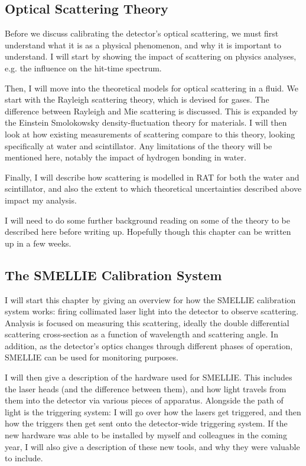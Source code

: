 \subsection{Optical Scattering Theory}
Before we discuss calibrating the detector's optical scattering, we must first understand what it is as a physical phenomenon, and why it is important to understand. I will start by showing the impact of scattering on physics analyses, e.g. the influence on the hit-time spectrum.

Then, I will move into the theoretical models for optical scattering in a fluid. We start with the Rayleigh scattering theory, which is devised for gases. The difference between Rayleigh and Mie scattering is discussed. This is expanded by the Einstein Smolokowsky density-fluctuation theory for materials. I will then look at how existing measurements of scattering compare to this theory, looking specifically at water and scintillator. Any limitations of the theory will be mentioned here, notably the impact of hydrogen bonding in water.

Finally, I will describe how scattering is modelled in RAT for both the water and scintillator, and also the extent to which theoretical uncertainties described above impact my analysis.

I will need to do some further background reading on some of the theory to be described here before writing up. Hopefully though this chapter can be written up in a few weeks.

\subsection{The SMELLIE Calibration System}
I will start this chapter by giving an overview for how the SMELLIE calibration system works: firing collimated laser light into the detector to observe scattering. Analysis is focused on measuring this scattering, ideally the double differential scattering cross-section as a function of wavelength and scattering angle. In addition, as the detector's optics changes through different phases of operation, SMELLIE can be used for monitoring purposes.

I will then give a description of the hardware used for SMELLIE. This includes the laser heads (and the difference between them), and how light travels from them into the detector via various pieces of apparatus. Alongside the path of light is the triggering system: I will go over how the lasers get triggered, and then how the triggers then get sent onto the detector-wide triggering system. If the new hardware was able to be installed by myself and colleagues in the coming year, I will also give a description of these new tools, and why they were valuable to include.

